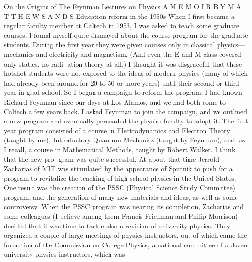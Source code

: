 \documentclass[11pt,oneside]{article}
\begin{document}
On the Origins of The Feynman Lectures on Physics A  M E M O I R  B Y  M A T T H E W  S A N D S Education reform in the 1950s When I first became a regular faculty member at Caltech in 1953, I was asked to teach some graduate courses. I found myself quite dismayed about the course program for the graduate students. During the first year they were given courses only in classical physics---mechanics and electricity and magnetism. (And even the E and M class covered only statics, no radi- ation theory at all.) I thought it was disgraceful that these hotshot students were not exposed to the ideas of modern physics (many of which had already been around for 20 to 50 or more years) until their second or third year in grad school. So I began a campaign to reform the program. I had known Richard Feynman since our days at Los Alamos, and we had both come to Caltech a few years back. I asked Feynman to join the campaign, and we outlined a new program and eventually persuaded the physics faculty to adopt it. The first year program consisted of a course in Electrodynamics and Electron Theory (taught by me), Introductory Quantum Mechanics (taught by Feynman), and, as I recall, a course in Mathematical Methods, taught by Robert Walker. I think that the new pro- gram was quite successful. At about that time Jerrold Zacharias of MIT was stimulated by the appearance of Sputnik to push for a program to revitalize the teaching of high school physics in the United States. One result was the creation of the PSSC (Physical Science Study Committee) program, and the generation of many new materials and ideas, as well as some controversy. When the PSSC program was nearing its completion, Zacharias and some colleagues (I believe among them Francis Friedman and Philip Morrison) decided that it was time to tackle also a revision of university physics. They organized a couple of large meetings of physics instructors, out of which came the formation of the Commission on College Physics, a national committee of a dozen university physics instructors, which was\par
\end{document}
